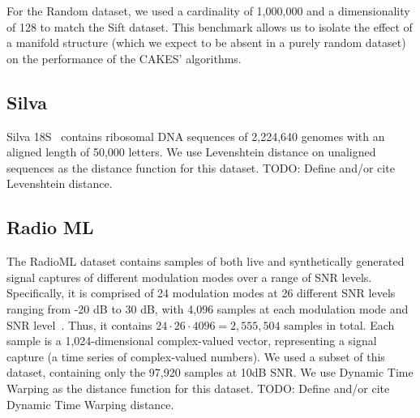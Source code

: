 For the Random dataset, we used a cardinality of 1,000,000 and a dimensionality of 128 to match the Sift dataset.
This benchmark allows us to isolate the effect of a manifold structure (which we expect to be absent in a purely random dataset) on the performance of the CAKES' algorithms. 


\subsection{Silva}
\label{subsec:silva}

Silva 18S~\cite{10.1093/nar/gks1219} contains ribosomal DNA sequences of 2,224,640 genomes with an aligned length of 50,000 letters.
We use Levenshtein distance on unaligned sequences as the distance function for this dataset.
{\color{red} TODO: Define and/or cite Levenshtein distance.}


\subsection{Radio ML}
\label{subsec:radioml}

The RadioML dataset contains samples of both live and synthetically generated signal captures of different modulation modes over a range of SNR levels.
Specifically, it is comprised of 24 modulation modes at 26 different SNR levels ranging from -20 dB to 30 dB, with 4,096 samples at each modulation mode and SNR level~\cite{oshea2018radioml}.
Thus, it contains $24 \cdot 26 \cdot 4096 = 2,555,504$ samples in total.
Each sample is a 1,024-dimensional complex-valued vector, representing a signal capture (a time series of complex-valued numbers).
We used a subset of this dataset, containing only the 97,920 samples at 10dB SNR.
We use Dynamic Time Warping as the distance function for this dataset.
{\color{red} TODO: Define and/or cite Dynamic Time Warping distance.}
